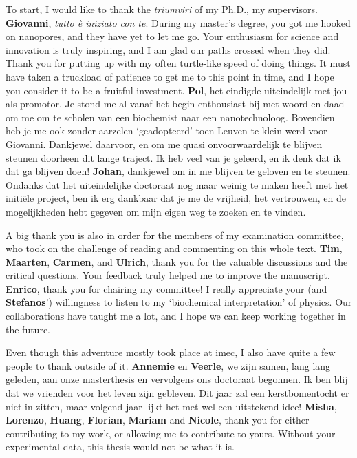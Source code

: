 To start, I would like to thank the \textit{triumviri} of my Ph.D., my supervisors. \textbf{Giovanni},
\textit{tutto \`{e} iniziato con te}. During my master's degree, you got me hooked on nanopores, and they have
yet to let me go. Your enthusiasm for science and innovation is truly inspiring, and I am glad our paths
crossed when they did. Thank you for putting up with my often turtle-like speed of doing things. It must have
taken a truckload of patience to get me to this point in time, and I hope you consider it to be a fruitful
investment. \textbf{Pol}, het eindigde uiteindelijk met jou als promotor. Je stond me al vanaf het begin
enthousiast bij met woord en daad om me om te scholen van een biochemist naar een nanotechnoloog. Bovendien
heb je me ook zonder aarzelen `geadopteerd' toen Leuven te klein werd voor Giovanni. Dankjewel daarvoor, en om
me quasi onvoorwaardelijk te blijven steunen doorheen dit lange traject. Ik heb veel van je geleerd, en ik
denk dat ik dat ga blijven doen! \textbf{Johan}, dankjewel om in me blijven te geloven en te steunen. Ondanks
dat het uiteindelijke doctoraat nog maar weinig te maken heeft met het initi\"{e}le project, ben ik erg
dankbaar dat je me de vrijheid, het vertrouwen, en de mogelijkheden hebt gegeven om mijn eigen weg te zoeken
en te vinden.

A big thank you is also in order for the members of my examination committee, who took on the challenge of
reading and commenting on this whole text. \textbf{Tim}, \textbf{Maarten}, \textbf{Carmen}, and
\textbf{Ulrich}, thank you for the valuable discussions and the critical questions. Your feedback truly helped
me to improve the manuscript. \textbf{Enrico}, thank you for chairing my committee! I really appreciate your
(and \textbf{Stefanos}') willingness to listen to my `biochemical interpretation' of physics. Our
collaborations have taught me a lot, and I hope we can keep working together in the future.

Even though this adventure mostly took place at imec, I also have quite a few people to thank outside of it.
\textbf{Annemie} en \textbf{Veerle}, we zijn samen, lang lang geleden, aan onze masterthesis en vervolgens ons
doctoraat begonnen. Ik ben blij dat we vrienden voor het leven zijn gebleven. Dit jaar zal een kerstbomentocht
er niet in zitten, maar volgend jaar lijkt het met wel een uitstekend idee! \textbf{Misha}, \textbf{Lorenzo},
\textbf{Huang}, \textbf{Florian}, \textbf{Mariam} and \textbf{Nicole}, thank you for either contributing to my
work, or allowing me to contribute to yours. Without your experimental data, this thesis would not be what it
is.

